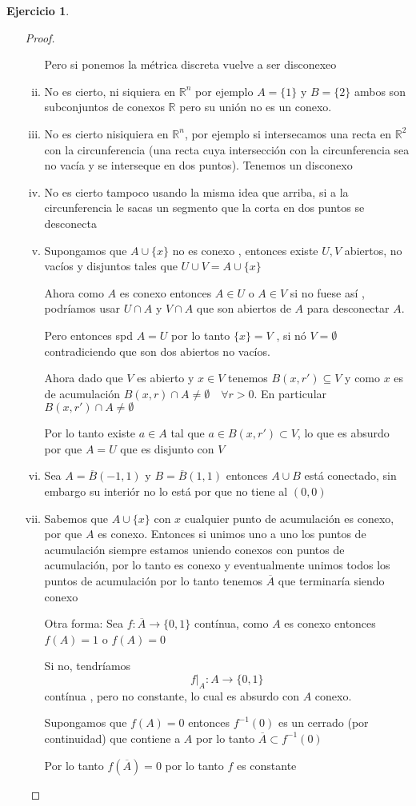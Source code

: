 \documentclass[11pt]{report}
\newcommand{\R}{\mathbb{R}}
\newcommand{\ra}{\rightarrow}
\newcommand{\ol}{\overline}
\theoremstyle{definition}
\newtheorem{ej}{Ejercicio}
\begin{document}
\begin{ej}
\begin{enumerate}
\begin{proof}
\begin{enumerate}[i.]
			Pero si ponemos la métrica discreta vuelve a ser disconexeo
		\item No es cierto, ni siquiera en $\R^n$ por ejemplo $A = \{1\}$ y $B=\{2\}$ ambos son subconjuntos de conexos $\R$ pero su unión no es un conexo. 
		\item No es cierto nisiquiera en $\R^n$, por ejemplo si intersecamos una recta en $\R^2$ con la circunferencia (una recta cuya intersección con la circunferencia sea no vacía y se interseque en dos puntos). Tenemos un disconexo 

		\item No es cierto tampoco usando la misma idea que arriba, si a la circunferencia le sacas un segmento que la corta en dos puntos se desconecta
		\item Supongamos que $A \cup \{x\}$ no es conexo , entonces existe $U,V$ abiertos, no vacíos y disjuntos tales que $U \cup V = A\cup \{x\}$ 

			Ahora como $A$ es conexo entonces $A \in U$ o $A \in V$ si no fuese así , podríamos usar $U\cap A$ y $V\cap A$ que son abiertos de $A$ para desconectar $A$.

			Pero entonces spd $A = U$ por lo tanto $\{x\} = V$ , si nó $V = \emptyset$ contradiciendo que son dos abiertos no vacíos.

			Ahora dado que $V$ es abierto y $x \in V$ tenemos $B(x,r') \subseteq V$ y como $x$ es de acumulación $B(x,r) \cap A \neq \emptyset \quad \forall r > 0$. En particular $B(x,r') \cap A \neq \emptyset$

			Por lo tanto existe $a \in A$ tal que $a \in B(x,r') \subset V$, lo que es absurdo por que $A = U$ que es disjunto con $V$

		\item Sea $A = \ol B(-1,1)$ y $B = \ol B(1,1)$ entonces $A \cup B$ está conectado, sin embargo su interiór no lo está por que no tiene al $(0,0)$
		\item Sabemos que $A \cup \{x\}$ con $x$ cualquier punto de acumulación es conexo, por que $A$ es conexo. Entonces si unimos uno a uno los puntos de acumulación siempre estamos uniendo conexos con puntos de acumulación, por lo tanto es conexo y eventualmente unimos todos los puntos de acumulación por lo tanto tenemos $\ol A$ que terminaría siendo conexo

			Otra forma: Sea $f: \ol A \ra \{0,1\}$ contínua, como $A$ es conexo entonces $f(A) = 1$ o $f(A) = 0$ 

			Si no, tendríamos $$f|_{A} : A \ra \{0,1\}$$ contínua , pero no constante, lo cual es absurdo con $A$ conexo.

			Supongamos que $f(A)=0$ entonces $f^{-1}(0)$ es un cerrado (por continuidad) que contiene a $A$ por lo tanto $\ol A \subset f^{-1}(0)$

			Por lo tanto $f(\ol A) = 0$ por lo tanto $f$ es constante
	\end{enumerate}
\end{proof}
\end{enumerate}
\end{ej}
\end{document}
